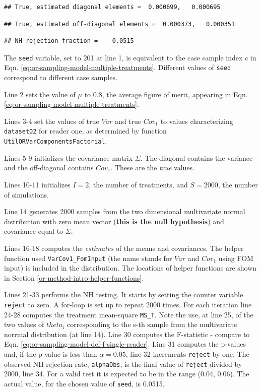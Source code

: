 \documentclass[
]{book}
\begin{document}
\begin{verbatim}
## True, estimated diagonal elements =  0.000699,   0.000695
\end{verbatim}

\begin{verbatim}
## True, estimated off-diagonal elements =  0.000373,   0.000351
\end{verbatim}

\begin{verbatim}
## NH rejection fraction =    0.0515
\end{verbatim}

The \texttt{seed} variable, set to 201 at line 1, is equivalent to the case sample index \(c\) in Eqn. \eqref{eq:or-sampling-model-multiple-treatments}. Different values of \texttt{seed} correspond to different case samples.

Line 2 sets the value of \(\mu\) to 0.8, the average figure of merit, appearing in Eqn. \eqref{eq:or-sampling-model-multiple-treatments}.

Lines 3-4 set the values of true \(Var\) and true \(Cov_1\) to values characterizing \texttt{dataset02} for reader one, as determined by function \texttt{UtilORVarComponentsFactorial}.

Lines 5-9 initializes the covariance matrix \(\Sigma\). The diagonal contains the variance and the off-diagonal contains \(Cov_1\). These are the \emph{true} values.

Lines 10-11 initializes \(I = 2\), the number of treatments, and \(S = 2000\), the number of simulations.

Line 14 generates 2000 samples from the two dimensional multivariate normal distribution with zero mean vector (\textbf{this is the null hypothesis}) and covariance equal to \(\Sigma\).

Lines 16-18 computes the \emph{estimates} of the means and covariances. The helper function used \texttt{VarCov1\_FomInput} (the name stands for \(Var\) and \(Cov_1\) using FOM input) is included in the distribution. The locations of helper functions are shown in Section \ref{or-method-intro-helper-functions}.

Lines 21-33 performs the NH testing. It starts by setting the counter variable \texttt{reject} to zero. A for-loop is set up to repeat 2000 times. For each iteration line 24-28 computes the treatment mean-square \texttt{MS\_T}. Note the use, at line 25, of the two values of \(theta_i\) corresponding to the s-th sample from the multivariate norrmal distribution (at line 14). Line 30 computes the F-statistic - compare to Eqn. \eqref{eq:or-sampling-model-def-f-single-reader}. Line 31 computes the p-values and, if the p-value is less than \(\alpha = 0.05\), line 32 increments \texttt{reject} by one. The observed NH rejection rate, \texttt{alphaObs}, is the final value of \texttt{reject} divided by 2000, line 34. For a valid test it is expected to be in the range (0.04, 0.06). The actual value, for the chosen value of \texttt{seed}, is 0.0515.
\end{document}
